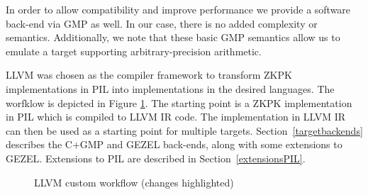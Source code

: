 In order to allow compatibility and improve performance we provide a
software back-end via GMP as well. In our case, there is no added
complexity or semantics. Additionally, we note that these basic GMP
semantics allow us to emulate a target supporting arbitrary-precision
arithmetic.

LLVM was chosen as the compiler framework to transform ZKPK
implementations in PIL into implementations in the desired
languages. The worfklow is depicted in Figure
\ref{fig:custom_llvm_workflow}. The starting point is a ZKPK
implementation in PIL which is compiled to LLVM IR code. The
implementation in LLVM IR can then be used as a starting point for
multiple targets. Section~\ref{targetbackends} describes the C+GMP and
GEZEL back-ends, along with some extensions to GEZEL. Extensions to
PIL are described in Section~\ref{extensionsPIL}.
\begin{figure}[hb!]
  \centering
  \caption{LLVM custom workflow (changes highlighted)}
  \label{fig:custom_llvm_workflow}
\end{figure}


